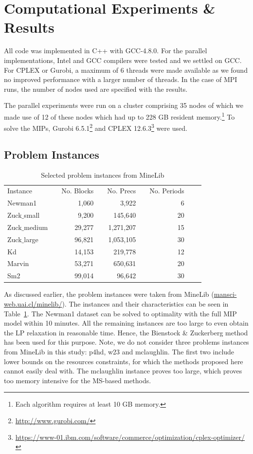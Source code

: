 \documentclass[authoryear,11pt,square,number,times,super,comma]{elsarticle}
\begin{document}
\section{Computational Experiments \& Results} \label{sec:expts_res}
All code was implemented in C++ with GCC-4.8.0. For the parallel implementations, Intel and GCC compilers were tested and we settled on GCC. For CPLEX or 
Gurobi, a maximum of 6 threads were made available as we found no improved performance with a larger number of threads. In the case of MPI runs, the number of 
nodes used are specified with the results. 

The parallel experiments were run on a cluster comprising 35 nodes of which we
made use of 12 of these nodes which had up to 228 GB resident
memory.\footnote{Each algorithm requires at least 10 GB memory.}  To solve the MIPs, Gurobi 6.5.1\footnote{\url{http://www.gurobi.com/} } and CPLEX 12.6.3\footnote{\url{https://www-01.ibm.com/software/commerce/optimization/cplex-optimizer/} } were used.

\subsection{Problem Instances}
\begin{table}[!htbp]
\centering
\caption{Selected problem instances from MineLib} 
\label{tab:instances}
\begin{tabular}{lrrrrrrrr}
\toprule
Instance && No. Blocks && No. Precs && No. Periods\\
\cmidrule{1-1}\cmidrule{3-3}\cmidrule{5-5}\cmidrule{7-7}
Newman1 && 1,060 && 3,922 && 6  \\
Zuck$\_$small && 9,200 && 145,640 &&20  \\
Zuck$\_$medium && 29,277 && 1,271,207 && 15  \\
Zuck$\_$large && 96,821 && 1,053,105 && 30  \\
Kd && 14,153 && 219,778 && 12  \\
Marvin && 53,271 && 650,631 && 20  \\
Sm2 && 99,014 && 96,642 && 30  \\
\bottomrule
\end{tabular}
\end{table}

As discussed earlier, the problem instances were taken from MineLib (\url{mansci-web.uai.cl/minelib/}). The instances and their characteristics can be seen in Table~\ref{tab:instances}. The Newman1 dataset can be solved to optimality with the full MIP model within 10 minutes. All the remaining instances are too large to even obtain the LP relaxation in reasonable time. Hence, the Bienstock \& Zuckerberg method has been used for this purpose. Note, we do not consider three problems instances from MineLib in this study: p4hd, w23 and mclaughlin. The first two include lower bounds on the resources constraints, for which the methods proposed here cannot easily deal with. The mclaughlin instance proves too large, which proves too memory intensive for the MS-based methods.  
\end{document}
